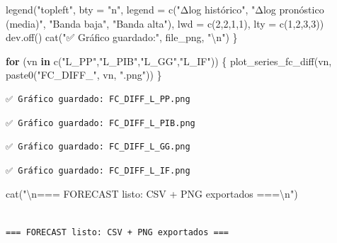 \documentclass[
  spanish,
  letterpaper,
  DIV=11,
  numbers=noendperiod]{scrartcl}
\newenvironment{Shaded}{\begin{snugshade}}{\end{snugshade}}
\newcommand{\AttributeTok}[1]{\textcolor[rgb]{0.40,0.45,0.13}{#1}}
\newcommand{\ControlFlowTok}[1]{\textcolor[rgb]{0.00,0.23,0.31}{\textbf{#1}}}
\newcommand{\DecValTok}[1]{\textcolor[rgb]{0.68,0.00,0.00}{#1}}
\newcommand{\FunctionTok}[1]{\textcolor[rgb]{0.28,0.35,0.67}{#1}}
\newcommand{\NormalTok}[1]{\textcolor[rgb]{0.00,0.23,0.31}{#1}}
\newcommand{\SpecialCharTok}[1]{\textcolor[rgb]{0.37,0.37,0.37}{#1}}
\newcommand{\StringTok}[1]{\textcolor[rgb]{0.13,0.47,0.30}{#1}}
\begin{document}
\begin{Shaded}
\begin{Highlighting}[]
  \FunctionTok{legend}\NormalTok{(}\StringTok{"topleft"}\NormalTok{, }\AttributeTok{bty =} \StringTok{"n"}\NormalTok{,}
         \AttributeTok{legend =} \FunctionTok{c}\NormalTok{(}\StringTok{"Δlog histórico"}\NormalTok{, }\StringTok{"Δlog pronóstico (media)"}\NormalTok{, }\StringTok{"Banda baja"}\NormalTok{, }\StringTok{"Banda alta"}\NormalTok{),}
         \AttributeTok{lwd =} \FunctionTok{c}\NormalTok{(}\DecValTok{2}\NormalTok{,}\DecValTok{2}\NormalTok{,}\DecValTok{1}\NormalTok{,}\DecValTok{1}\NormalTok{), }\AttributeTok{lty =} \FunctionTok{c}\NormalTok{(}\DecValTok{1}\NormalTok{,}\DecValTok{2}\NormalTok{,}\DecValTok{3}\NormalTok{,}\DecValTok{3}\NormalTok{))}
  \FunctionTok{dev.off}\NormalTok{()}
  \FunctionTok{cat}\NormalTok{(}\StringTok{"✅ Gráfico guardado:"}\NormalTok{, file\_png, }\StringTok{"}\SpecialCharTok{\textbackslash{}n}\StringTok{"}\NormalTok{)}
\NormalTok{\}}

\ControlFlowTok{for}\NormalTok{ (vn }\ControlFlowTok{in} \FunctionTok{c}\NormalTok{(}\StringTok{"L\_PP"}\NormalTok{,}\StringTok{"L\_PIB"}\NormalTok{,}\StringTok{"L\_GG"}\NormalTok{,}\StringTok{"L\_IF"}\NormalTok{)) \{}
  \FunctionTok{plot\_series\_fc\_diff}\NormalTok{(vn, }\FunctionTok{paste0}\NormalTok{(}\StringTok{"FC\_DIFF\_"}\NormalTok{, vn, }\StringTok{".png"}\NormalTok{))}
\NormalTok{\}}
\end{Highlighting}
\end{Shaded}

\begin{verbatim}
✅ Gráfico guardado: FC_DIFF_L_PP.png 
\end{verbatim}

\begin{verbatim}
✅ Gráfico guardado: FC_DIFF_L_PIB.png 
\end{verbatim}

\begin{verbatim}
✅ Gráfico guardado: FC_DIFF_L_GG.png 
\end{verbatim}

\begin{verbatim}
✅ Gráfico guardado: FC_DIFF_L_IF.png 
\end{verbatim}

\begin{Shaded}
\begin{Highlighting}[]
\FunctionTok{cat}\NormalTok{(}\StringTok{"}\SpecialCharTok{\textbackslash{}n}\StringTok{=== FORECAST listo: CSV + PNG exportados ===}\SpecialCharTok{\textbackslash{}n}\StringTok{"}\NormalTok{)}
\end{Highlighting}
\end{Shaded}

\begin{verbatim}

=== FORECAST listo: CSV + PNG exportados ===
\end{verbatim}
\end{document}

